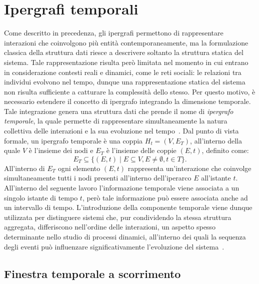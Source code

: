 
\section{Ipergrafi temporali}\label{sec:ipergrafi_temporali}

Come descritto in precedenza, gli ipergrafi permettono di rappresentare interazioni che coinvolgono più entità contemporaneamente, ma la formulazione classica della struttura dati riesce a descrivere soltanto la struttura statica del sistema.
Tale rappresentazione risulta però limitata nel momento in cui entrano in considerazione contesti reali e dinamici, come le reti sociali: le relazioni tra individui evolvono nel tempo, dunque una rappresentazione statica del sistema non risulta sufficiente a catturare la complessità dello stesso.
Per questo motivo, è necessario estendere il concetto di ipergrafo integrando la dimensione temporale.
Tale integrazione genera una struttura dati che prende il nome di \textit{ipergrafo temporale}, la quale permette di rappresentare simultaneamente la natura collettiva delle interazioni e la sua evoluzione nel tempo~\cite{cencetti2021}.
Dal punto di vista formale, un ipergrafo temporale è una coppia $H_t = (V, E_T)$, all'interno della quale $V$ è l'insieme dei nodi e $E_T$ è l'insieme delle coppie $(E, t)$, definito come: 
\[
    E_T \subseteq \{(E,t) \mid E \subseteq V, E \neq \emptyset, t \in T\}.
\]
All'interno di $E_T$ ogni elemento $(E,t)$ rappresenta un'interazione che coinvolge simultaneamente tutti i nodi presenti all'interno dell'iperarco $E$ all'istante $t$.
All'interno del seguente lavoro l'informazione temporale viene associata a un singolo istante di tempo $t$, però tale informazione può essere associata anche ad un intervallo di tempo.
L'introduzione della componente temporale viene dunque utilizzata per distinguere sistemi che, pur condividendo la stessa struttura aggregata, differiscono nell'ordine delle interazioni, un aspetto spesso determinante nello studio di processi dinamici, all'interno dei quali la sequenza degli eventi può influenzare significativamente l'evoluzione del sistema~\cite{holme2012}.

\subsection{Finestra temporale a scorrimento}

